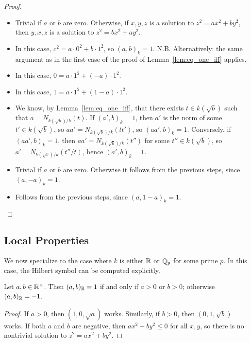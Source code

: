 \begin{proof}
	\leanok

	\begin{itemize}
		\item Trivial if $a$ or $b$ are zero. Otherwise, if $x,y,z$ is a solution to $z^2 = ax^2 + by^2$, then $y,x,z$ is a solution to
	$z^2 = bx^2 + ay^2$.
		\item In this case, $c^2 = a \cdot 0^2 + b \cdot 1^2$, so $(a,b)_k=1$.
		N.B. Alternatively: the same argument as in the first case of the proof of Lemma~\ref{lem:eq_one_iff} applies.
		\item In this case, $0 = a \cdot 1^2 + (-a) \cdot 1^2$.
		\item In this case, $1 = a \cdot 1^2 + (1 - a) \cdot 1^2$.
		\item We know, by Lemma~\ref{lem:eq_one_iff}, that there exists $t \in k(\sqrt{b})$ such that
		$a = N_{k(\sqrt{b})/k}(t)$. If $(a',b)_k=1$, then $a'$ is the norm of some $t' \in k(\sqrt{b})$,
		so $aa' = N_{k(\sqrt{b})/k}(t t')$, so $(aa', b)_k = 1$. Conversely, if $(aa', b)_k = 1$, then
		$aa' = N_{k(\sqrt{b})/k}(t'')$ for some $t'' \in k(\sqrt{b})$, so
		$a' = N_{k(\sqrt{b})/k}(t''/t)$, hence $(a', b)_k = 1$.
		\item Trivial if $a$ or $b$ are zero. Otherwise it follows from the previous steps, since $(a, -a)_k = 1$.
		\item Follows from the previous steps, since $(a, 1 - a)_k = 1$.
	\end{itemize}
\end{proof}
\subsection{Local Properties}
We now specialize to the case where $k$ is either $\mathbb{R}$ or $\mathbb{Q}_p$ for some prime $p$. In this case, the Hilbert symbol can be computed explicitly.

\begin{theorem}
	\label{thm:real}
	\leanok
	Let $a, b \in \mathbb{R}^\times$. Then $(a, b)_{\mathbb{R}} = 1$ if and only if $a > 0$ or $b > 0$; otherwise $(a, b)_{\mathbb{R}} = -1$.
\end{theorem}

\begin{proof}
	If $a>0$, then $(1,0,\sqrt{a})$ works. Similarly, if $b>0$, then $(0,1,\sqrt{b})$ works.
	If both $a$ and $b$ are negative, then $ax^2 + by^2 \le 0$ for all $x,y$, so there is no
	nontrivial solution to $z^2 = ax^2 + by^2$.
\end{proof}

